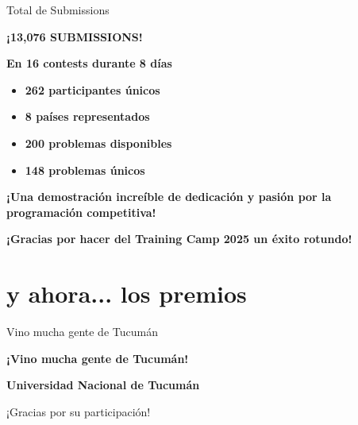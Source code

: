 \documentclass{beamer}
\begin{document}
\begin{frame}{Total de Submissions}
\begin{center}
\Huge
\textbf{¡13,076 SUBMISSIONS!}

\vspace{0.7cm}

\Large
\textbf{En 16 contests durante 8 días}

\vspace{0.3cm}

\normalsize
\begin{itemize}
\item \textbf{262 participantes únicos}
\item \textbf{8 países representados}
\item \textbf{200 problemas disponibles}
\item \textbf{148 problemas únicos}
\end{itemize}

\vspace{0.7cm}

\textbf{¡Una demostración increíble de dedicación y pasión por la programación competitiva!}

\vspace{0.3cm}

\textbf{¡Gracias por hacer del Training Camp 2025 un éxito rotundo!}
\end{center}
\end{frame}


\section{y ahora... los premios}

\begin{frame}{Vino mucha gente de Tucumán}
\begin{center}
\Large
\textbf{¡Vino mucha gente de Tucumán!}

\vspace{1cm}


\vspace{1cm}

\normalsize
\textbf{Universidad Nacional de Tucumán}

\vspace{0.5cm}

¡Gracias por su participación!
\end{center}
\end{frame}
\end{document}
